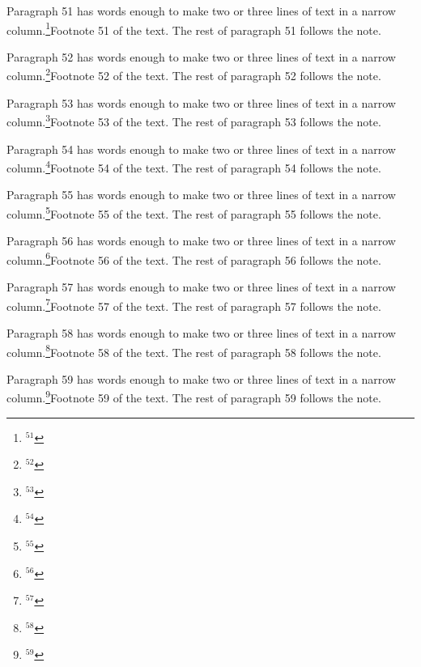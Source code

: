 Paragraph 51 has words enough to make two or three lines of text in a narrow column.\footnote{$^{51}$}{Footnote 51 of the text.} The rest of paragraph 51 follows the note.\par
Paragraph 52 has words enough to make two or three lines of text in a narrow column.\footnote{$^{52}$}{Footnote 52 of the text.} The rest of paragraph 52 follows the note.\par
Paragraph 53 has words enough to make two or three lines of text in a narrow column.\footnote{$^{53}$}{Footnote 53 of the text.} The rest of paragraph 53 follows the note.\par
Paragraph 54 has words enough to make two or three lines of text in a narrow column.\footnote{$^{54}$}{Footnote 54 of the text.} The rest of paragraph 54 follows the note.\par
Paragraph 55 has words enough to make two or three lines of text in a narrow column.\footnote{$^{55}$}{Footnote 55 of the text.} The rest of paragraph 55 follows the note.\par
Paragraph 56 has words enough to make two or three lines of text in a narrow column.\footnote{$^{56}$}{Footnote 56 of the text.} The rest of paragraph 56 follows the note.\par
Paragraph 57 has words enough to make two or three lines of text in a narrow column.\footnote{$^{57}$}{Footnote 57 of the text.} The rest of paragraph 57 follows the note.\par
Paragraph 58 has words enough to make two or three lines of text in a narrow column.\footnote{$^{58}$}{Footnote 58 of the text.} The rest of paragraph 58 follows the note.\par
Paragraph 59 has words enough to make two or three lines of text in a narrow column.\footnote{$^{59}$}{Footnote 59 of the text.} The rest of paragraph 59 follows the note.\par
\bye
